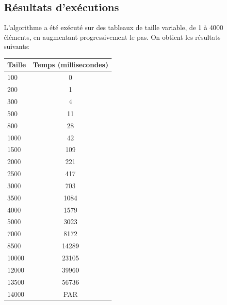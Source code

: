 \documentclass[a4paper, 12pt]{article}
\begin{document}
\subsection{Résultats d’exécutions}
L'algorithme a été exécuté sur des tableaux de taille variable, de 1 à 4000 éléments, en augmentant progressivement le pas. On obtient les résultats suivants:

\begin{minipage}[c]{0.4\linewidth}
   \begin{tabular}{|l|c|}
      \hline
      Taille & Temps (millisecondes) \\
      \hline
   100	& 0 \\
   200	& 1\\
   300	& 4\\
   500	& 11\\
   800	& 28\\
   1000	& 42\\
   1500	& 109\\
   2000	& 221\\
   2500	& 417\\
   3000	& 703\\
   3500	& 1084\\
   4000	& 1579\\
   5000	& 3023\\
   7000	& 8172\\
   8500	& 14289\\
   10000 & 	23105\\
   12000& 	39960\\
   13500& 	56736\\
   14000& 	PAR\\
   \hline
   \end{tabular}
\end{minipage}\hfill
\end{document}
